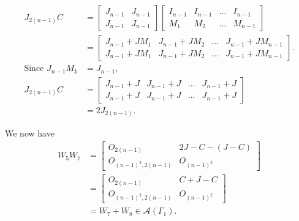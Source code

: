 \begin{itemize}
    \begin{align*}
        J_{2(n-1)}C
        &= \begin{bmatrix}
            J_{n-1} & J_{n-1}\\
            J_{n-1} & J_{n-1}
        \end{bmatrix}\begin{bmatrix}
            I_{n-1} & I_{n-1} & \dots & I_{n-1}\\
            M_1 & M_2 & \dots & M_{n-1}
        \end{bmatrix}\\
        &= \begin{bmatrix}
            J_{n-1} + JM_1 & J_{n-1} + JM_2 & \dots &J_{n-1} + JM_{n-1}\\
            J_{n-1} + JM_1 & J_{n-1} + JM_2 & \dots &J_{n-1} + JM_{n-1}
        \end{bmatrix}.\\
        \text{Since }J_{n-1}M_k &= J_{n-1},\\
        J_{2(n-1)}C &= \begin{bmatrix}
            J_{n-1} + J & J_{n-1} + J & \dots &J_{n-1} + J\\
            J_{n-1} + J & J_{n-1} + J & \dots &J_{n-1} + J
        \end{bmatrix}\\
        &= 2J_{2(n-1)}.
    \end{align*}

    We now have
    \begin{align*}
         W_5W_7
         &=\begin{bmatrix}
            O_{2(n-1)} &2J-C - (J-C) \\
            O_{(n-1)^2, 2(n-1)} & O_{(n-1)^2}
        \end{bmatrix}\\
        &= \begin{bmatrix}
            O_{2(n-1)} & C + J-C \\
            O_{(n-1)^2, 2(n-1)} & O_{(n-1)^2}
        \end{bmatrix}\\
        &= W_7 + W_8\in\mathcal{A}(\Gamma_1).
    \end{align*}
    

\end{itemize}
